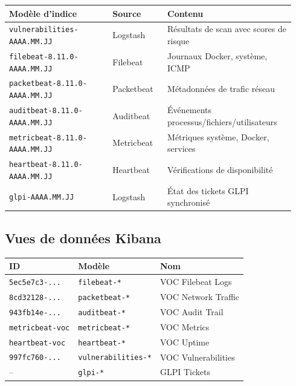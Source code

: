\documentclass[11pt,a4paper]{article}
\begin{document}
\begin{center}
\small
\begin{longtable}{@{}p{0.34\linewidth} p{0.18\linewidth} p{0.42\linewidth}@{}}
\toprule
\textbf{Mod\`ele d'indice} & \textbf{Source} & \textbf{Contenu} \\
\midrule
\endhead
\bottomrule
\endlastfoot
\texttt{vulnerabilities-AAAA.MM.JJ} & Logstash & R\'esultats de scan avec scores de risque \\
\texttt{filebeat-8.11.0-AAAA.MM.JJ} & Filebeat & Journaux Docker, syst\`eme, ICMP \\
\texttt{packetbeat-8.11.0-AAAA.MM.JJ} & Packetbeat & M\'etadonn\'ees de trafic r\'eseau \\
\texttt{auditbeat-8.11.0-AAAA.MM.JJ} & Auditbeat & \'Ev\'enements processus/fichiers/utilisateurs \\
\texttt{metricbeat-8.11.0-AAAA.MM.JJ} & Metricbeat & M\'etriques syst\`eme, Docker, services \\
\texttt{heartbeat-8.11.0-AAAA.MM.JJ} & Heartbeat & V\'erifications de disponibilit\'e \\
\texttt{glpi-AAAA.MM.JJ} & Logstash & \'Etat des tickets GLPI synchronis\'e \\
\bottomrule
\end{longtable}
\end{center}

\subsection{Vues de donn\'ees Kibana}

\begin{center}
\small
\begin{tabularx}{\linewidth}{@{}l X l@{}}
\toprule
\textbf{ID} & \textbf{Mod\`ele} & \textbf{Nom} \\
\midrule
\texttt{5ec5e7c3-...} & \texttt{filebeat-*} & VOC Filebeat Logs \\
\texttt{8cd32128-...} & \texttt{packetbeat-*} & VOC Network Traffic \\
\texttt{943fb14e-...} & \texttt{auditbeat-*} & VOC Audit Trail \\
\texttt{metricbeat-voc} & \texttt{metricbeat-*} & VOC Metrics \\
\texttt{heartbeat-voc} & \texttt{heartbeat-*} & VOC Uptime \\
\texttt{997fc760-...} & \texttt{vulnerabilities-*} & VOC Vulnerabilities \\
-- & \texttt{glpi-*} & GLPI Tickets \\
\bottomrule
\end{tabularx}
\end{center}
\end{document}
